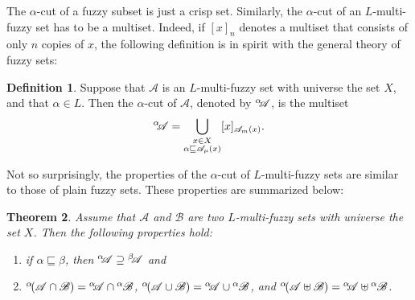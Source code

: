 \documentclass{amsart}
\newtheorem{theorem}{Theorem}[section]
\theoremstyle{definition}
\newtheorem{definition}[theorem]{Definition}
\begin{document}
The $\alpha$-cut of a fuzzy subset is just a crisp set. Similarly, the 
$\alpha$-cut of
an $L$-multi-fuzzy set has to be a multiset. Indeed, if $[x]_{n}$ denotes a
multiset that consists of only $n$ copies of $x$, the following definition 
is in spirit with the general theory of fuzzy sets:
\begin{definition}
Suppose that $\mathscr{A}$ is an 
$L$-multi-fuzzy set with universe the set $X$, and
that $\alpha\in L$. Then the $\alpha$-cut of $\mathscr{A}$, denoted by
${}^{\alpha}\kern-0.25em\mathscr{A}$, is the multiset
\begin{displaymath}
{}^{\alpha}\kern-0.25em\mathscr{A}=
\bigcup_{\substack{x\in X \\ \alpha\sqsubseteq\mathscr{A}_{\mu}(x)}} [x]_{\mathscr{A}_{m}(x)}.
\end{displaymath}
\end{definition}
Not so surprisingly, the properties of the $\alpha$-cut of $L$-multi-fuzzy sets
are similar to those of plain fuzzy sets. These properties are summarized 
below:
\begin{theorem}\label{alpha-proof}
Assume that $\mathscr{A}$ and $\mathscr{B}$ are two $L$-multi-fuzzy sets with universe
the set $X$. Then the following properties hold:
\begin{enumerate}
\item if $\alpha\sqsubseteq\beta$, then ${}^{\alpha}\kern-0.25em\mathscr{A}\supseteq 
{}^{\beta}\kern-0.25em\mathscr{A}$ and
\item $^{\alpha}\kern-0.15em(\mathscr{A}\cap
\mathscr{B})={}^{\alpha}\kern-0.25em
\mathscr{A}\cap{}^{\alpha}\kern-0.05em\mathscr{B}$,
$^{\alpha}\kern-0.15em(\mathscr{A}\cup\mathscr{B})={}^{\alpha}\kern-0.25em
\mathscr{A}\cup{}^{\alpha}\kern-0.05em\mathscr{B}$, and
$^{\alpha}\kern-0.15em(\mathscr{A}\uplus\mathscr{B})=
{}^{\alpha}\kern-0.25em\mathscr{A}\uplus{}^{\alpha}\kern-0.05em\mathscr{B}$.
\end{enumerate}
\end{theorem}
\end{document}
